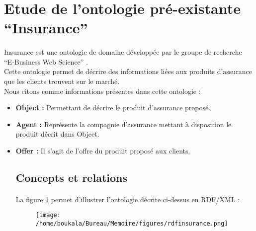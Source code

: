 \documentclass[12pt, a4paper, oneside]{book}
\begin{document}
\section{Etude de l'ontologie pré-existante “Insurance”}
\paragraph{}
Insurance est une ontologie de domaine développée par le groupe de recherche “E-Business Web Science” \citep{insurance}. \\
Cette ontologie permet de décrire des informations liées aux produits d'assurance que les clients trouvent sur le marché.\\
Nous citons comme informations présentes dans cette ontologie : \\

\begin{itemize}

\item \textbf{Object : }Permettant de décrire le produit d'assurance proposé.\\
\item \textbf{Agent : }Représente la compagnie d'assurance mettant à disposition le produit décrit dans Object.\\
\item \textbf{Offer : }Il s'agit de l'offre du produit proposé aux clients.\\


\subsection{Concepts et relations}


\paragraph{}
La figure \ref{exempleOnto} permet d’illustrer l’ontologie décrite ci-dessus en RDF/XML : 

\begin{figure}[h!]
\begin{center}
\texttt{[image: /home/boukala/Bureau/Memoire/figures/rdfinsurance.png]}
\label{exempleOnto}
\end{center}
\end{figure}



\end{itemize}
\end{document}
